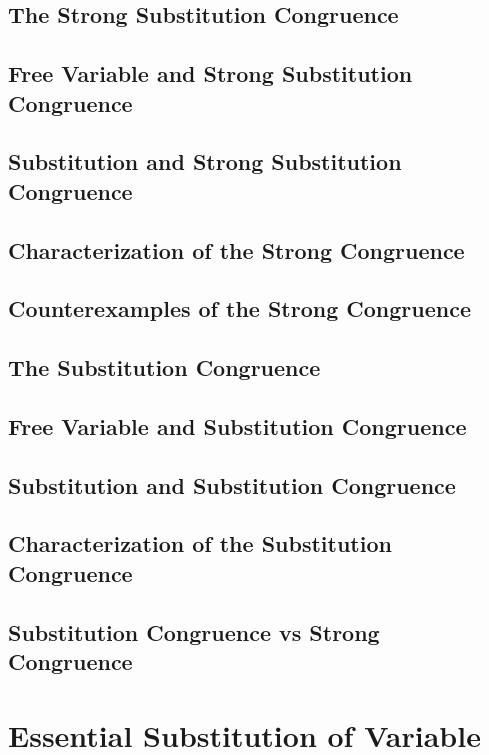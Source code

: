 \documentclass{report}
\begin{document}
    \subsection{The Strong Substitution Congruence}
      
    \subsection{Free Variable and Strong Substitution Congruence}
      
    \subsection{Substitution and Strong Substitution Congruence}
      
    \subsection{Characterization of the Strong Congruence}
      
    \subsection{Counterexamples of the Strong Congruence}
      
    \subsection{The Substitution Congruence}
      
    \subsection{Free Variable and Substitution Congruence}
      
    \subsection{Substitution and Substitution Congruence}
      
    \subsection{Characterization of the Substitution Congruence}
      
    \subsection{Substitution Congruence vs Strong Congruence}
      
\section{Essential Substitution of Variable}
\end{document}
